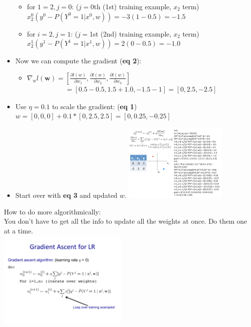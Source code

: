 \begin{itemize}
\begin{itemize}
			\item for $1=2, j=0$: ($j=$0th (1st) training example, $x_2$ term) \hfill \\
				 $x_2^0(y^0 - P(Y^0=1|x^0, w)) = -3(1-0.5) = -1.5$ 
			\item for $i=2, j=1$: ($j=$1st (2nd) training example, $x_2$ term) \hfill \\
				 $x_2^1(y^1 - P(Y^1=1|x^1, w)) = 2(0-0.5) = -1.0$ 
		\end{itemize}
	\item Now we can compute the gradient (\textbf{eq 2}):
		\begin{itemize}
			\item $\nabla_w l(\bm{w}) = [\frac{\partial l(w)}{\partial w_1}, \frac{\partial l(w)}{\partial w_2}, \frac{\partial l(w)}{\partial w_3}]$
				\begin{align*}
						&= [0.5 - 0.5, 1.5 + 1.0, -1.5 - 1] = [0, 2.5, -2.5]
				\end{align*}
		\end{itemize}
	
	\item Use $\eta = 0.1$ to scale the gradient:  (\textbf{eq 1}) \hfill \\
			$w = [0,0,0] + 0.1*[0, 2.5, 2.5] = [0, 0.25, -0.25]$
	\item Start over with \textbf{eq 3} and updated $w$.
		\includegraphics[width=2in]{figures/logistic_regression_ex_loop_2.pdf}
\end{itemize}

How to do more algorithmically:  \hfill \\
You don't have to get all the info to update all the weights at once.  
Do them one at a time.  \hfill \\
\includegraphics[width=2.5in]{figures/gradient_descent_algorthim.pdf}

